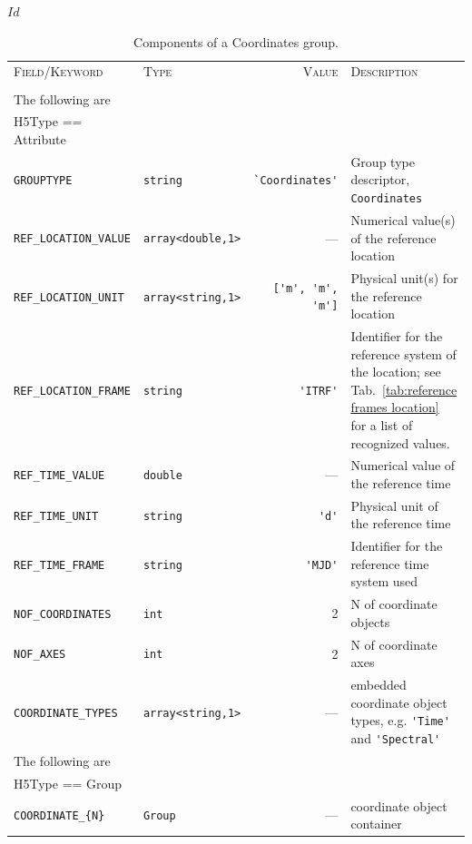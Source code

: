 \svnInfo $Id$


\begin{table}[ht]
 \centering
  \begin{tabular}{|llrp{4.0cm}|}
    \hline
    \textsc{Field/Keyword}  & \textsc{Type} & \textsc{Value} & \textsc{Description} \\
    \sc   & \sc & \sc & \\
    \hline \hline
    \sc The following are & \sc & \sc & \\
    \sc H5Type == Attribute & \sc & \sc & \\
    \hline
    \small{\verb|GROUPTYPE|} & \verb|string| & \verb|`Coordinates'| & Group type descriptor, \texttt{Coordinates} \\
    \small{\verb|REF_LOCATION_VALUE|}  & \verb|array<double,1>| & --- & Numerical value(s) of the reference location \\
    \small{\verb|REF_LOCATION_UNIT|} & \verb|array<string,1>| & \verb|['m', 'm', 'm']| & Physical unit(s) for the reference location \\
    \small{\verb|REF_LOCATION_FRAME|} & \texttt{string} & \verb|'ITRF'| & Identifier for the reference system of the location; see Tab.~\ref{tab:reference frames location} for a list of recognized values. \\
    \small{\verb|REF_TIME_VALUE|} & \texttt{double} & --- & Numerical value of the reference time \\
    \small{\verb|REF_TIME_UNIT|} & \texttt{string} & \verb|'d'| & Physical unit of the reference time \\
    \small{\verb|REF_TIME_FRAME|} & \texttt{string} & \verb|'MJD'| & Identifier for the reference time system used \\
    \small{\verb|NOF_COORDINATES|} & \texttt{int} & 2 & N of coordinate objects \\
    \small{\verb|NOF_AXES|} & \texttt{int} & 2 & N of coordinate axes \\
    \small{\verb|COORDINATE_TYPES|} & \verb|array<string,1>| & --- & embedded coordinate object types, e.g. \verb|'Time'| and \verb|'Spectral'| \\
    \hline
    \sc The following are & \sc & \sc & \\
    \sc H5Type == Group & \sc & \sc & \\
    \hline
    \small{\verb|COORDINATE_{N}|} & \verb|Group| & --- & coordinate object container \\
    \hline
  \end{tabular}
  \caption{Components of a Coordinates group.}
  \label{tab:coordinates-group} 
\end{table}

